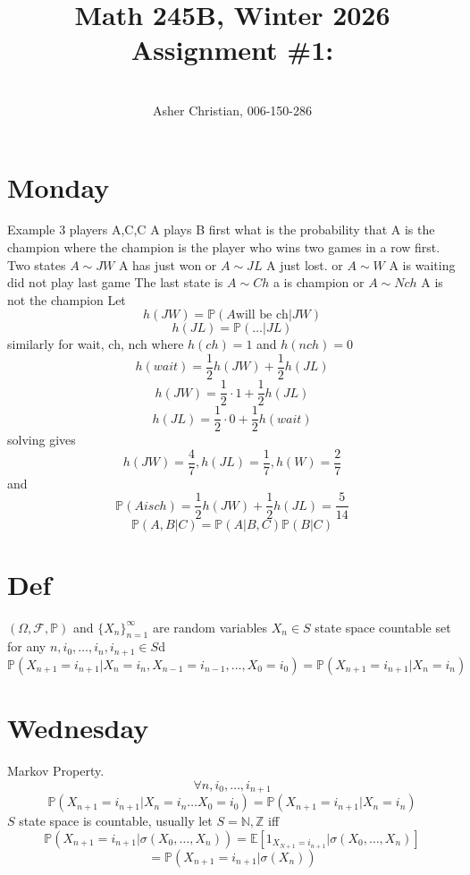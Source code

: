\documentclass[11pt]{article}
\newcommand{\cnum}{Math 245B}
\newcommand{\ced}{Winter 2026}
\newcommand{\ctitle}[4]{\title{\vspace{-0.5in}\cnum, \ced\\Assignment #1: #2}\author{\vspace{-0.35in}\\#3, #4}}
\begin{document}
\ctitle{\#1}{}{Asher Christian}{006-150-286}
\date{}
\maketitle

\section{Monday}
Example 3 players A,C,C A plays B first what is the probability that A is the champion where the champion
is the player who wins two games in a row first.
Two states $A \sim JW$ A has just won or  $A \sim JL$ A just lost. or  $A \sim W$ A is waiting did not play last game
The last state is  $A \sim Ch$ a is champion or  $A \sim Nch$ A is not the champion
Let
 \[
     h(JW) = \mathbb{P}(A \text{will be ch}| JW)
\] 
\[
h(JL) = \mathbb{P}( \dots | JL)
\] 
similarly for wait, ch, nch where $h(ch) = 1$ and  $h(nch) = 0$
 \[
h(wait) = \frac{1}{2} h(JW)  + \frac{1}{2} h(JL)
\] 
\[
h(JW) = \frac{1}{2} \cdot 1 + \frac{1}{2} h(JL)
\] 
\[
h(JL) = \frac{1}{2} \cdot 0 + \frac{1}{2} h(wait)
\] 
solving gives
\[
h(JW) = \frac{4}{7}, h(JL) = \frac{1}{7}, h(W) = \frac{2}{7}
\] 
and
\[
\mathbb{P}(A is ch) = \frac{1}{2}h(JW) + \frac{1}{2}h(JL) = \frac{5}{14}
\] 
\[
\mathbb{P}(A,B | C) = \mathbb{P}(A | B,C) \mathbb{P}(B |C)
\] 
\section{Def}
$(\Omega, \mathcal{F}, \mathbb{P})$ and $\{X_n\}_{n=1}^{\infty}$ are random variables $X_n \in S$ state space countable set
for any  $n, i_0,\dots,i_n,i_{n+1} \in S$d
\[
    \mathbb{P}(X_{n+1} = i_{n+1} | X_n = i_n, X_{n-1} = i_{n-1},\dots,X_0 =i_0) = \mathbb{P}(X_{n+1} = i_{n+1} | X_n = i_n)
\] 

\section{Wednesday}
Markov Property.
\[
    \forall n, i_0,\dots,i_{n+1}
\] 
\[
    \mathbb{P}(X_{n+1} = i_{n+1} | X_n = i_n \dots X_0 = i_0) = \mathbb{P}(X_{n+1} = i_{n+1} | X_n = i_n)
\] 
$S$ state space is countable, usually let  $S = \mathbb{N}, \mathbb{Z}$ iff
\[
    \mathbb{P}(X_{n+1} = i_{n+1} | \sigma(X_0,\dots,X_n)) = \mathbb{E}[1_{X_{N+1} = i_{n+1}} | \sigma(X_0,\dots,X_n)]
\] 
\[
    = \mathbb{P}(X_{n+1} = i_{n+1} | \sigma(X_n))
\] 
\end{document}
